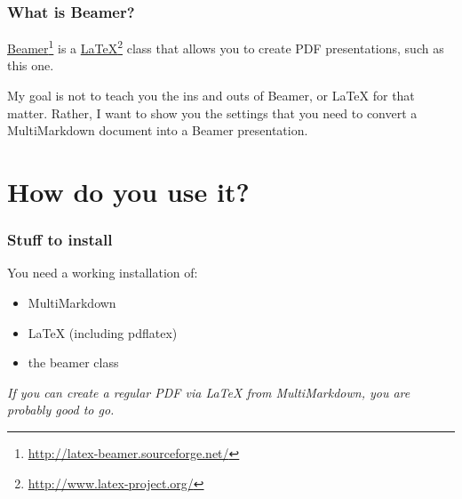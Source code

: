 \begin{frame}

\frametitle{What is Beamer?}
\label{whatisbeamer}

\href{http://latex-beamer.sourceforge.net/}{Beamer}\footnote{\href{http://latex-beamer.sourceforge.net/}{http:/\slash latex-beamer.sourceforge.net\slash }} is a \href{http://www.latex-project.org/}{LaTeX}\footnote{\href{http://www.latex-project.org/}{http:/\slash www.latex-project.org\slash }} class that allows you
to create PDF presentations, such as this one.

My goal is not to teach you the ins and outs of Beamer, or LaTeX for that
matter. Rather, I want to show you the settings that you need to convert a
MultiMarkdown document into a Beamer presentation.

\end{frame}

\section{How do you use it?}
\label{howdoyouuseit}

\begin{frame}

\frametitle{Stuff to install}
\label{stufftoinstall}

You need a working installation of:

\begin{itemize}
\item MultiMarkdown

\item LaTeX (including pdflatex)

\item the beamer class

\end{itemize}

\emph{If you can create a regular PDF via LaTeX from MultiMarkdown, you are
probably good to go.}

\end{frame}

